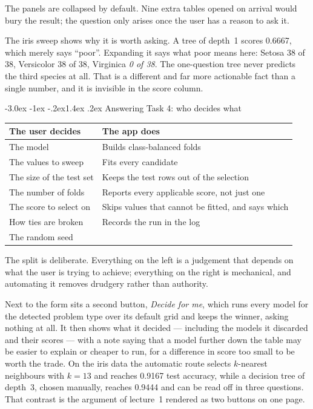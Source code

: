 \documentclass[11pt,a4paper]{article}
\makeatletter
\renewcommand\subsection{\@startsection{subsection}{2}{\z@}%
  {-3.0ex \@plus -1ex \@minus -.2ex}{1.4ex \@plus .2ex}%
  {\normalfont\large\sffamily\bfseries\color{accent}}}
\makeatother
\begin{document}
The panels are collapsed by default. Nine extra tables opened on arrival would
bury the result; the question only arises once the user has a reason to ask it.

The iris sweep shows why it is worth asking. A tree of depth~1 scores 0.6667,
which merely says ``poor''. Expanding it says what poor means here: Setosa 38 of
38, Versicolor 38 of 38, Virginica \emph{0 of 38}. The one-question tree never
predicts the third species at all. That is a different and far more actionable
fact than a single number, and it is invisible in the score column.

\subsection{Answering Task 4: who decides what}

\begin{center}
\begin{tabularx}{0.94\textwidth}{@{}XX@{}}
\toprule
\textbf{The user decides} & \textbf{The app does} \\
\midrule
The model & Builds class-balanced folds \\
The values to sweep & Fits every candidate \\
The size of the test set & Keeps the test rows out of the selection \\
The number of folds & Reports every applicable score, not just one \\
The score to select on & Skips values that cannot be fitted, and says which \\
How ties are broken & Records the run in the log \\
The random seed & \\
\bottomrule
\end{tabularx}
\end{center}

The split is deliberate. Everything on the left is a judgement that depends on
what the user is trying to achieve; everything on the right is mechanical, and
automating it removes drudgery rather than authority.

Next to the form sits a second button, \emph{Decide for me}, which runs every
model for the detected problem type over its default grid and keeps the winner,
asking nothing at all. It then shows what it decided --- including the models it
discarded and their scores --- with a note saying that a model further down the
table may be easier to explain or cheaper to run, for a difference in score too
small to be worth the trade. On the iris data the automatic route selects
$k$-nearest neighbours with $k=13$ and reaches 0.9167 test accuracy, while a
decision tree of depth~3, chosen manually, reaches 0.9444 and can be read off in
three questions. That contrast is the argument of lecture~1 rendered as two
buttons on one page.
\end{document}
